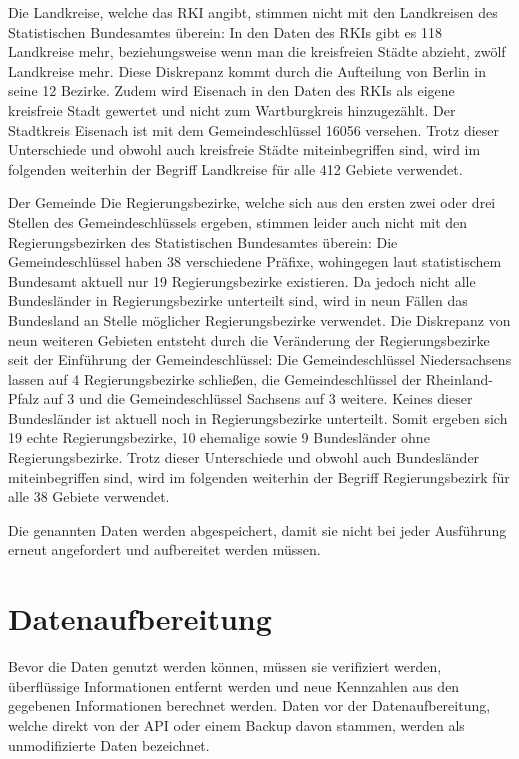Die Landkreise, welche das RKI angibt, stimmen nicht mit den Landkreisen des Statistischen Bundesamtes  \autocite{statistischesBundesamtLandkreise}
überein: In den Daten des RKIs gibt es 118 Landkreise mehr, beziehungsweise wenn man die kreisfreien Städte abzieht, zwölf Landkreise mehr. Diese Diskrepanz kommt durch die Aufteilung von Berlin in seine 12 Bezirke. Zudem wird Eisenach in den Daten des RKIs als eigene kreisfreie Stadt gewertet und nicht zum Wartburgkreis hinzugezählt. Der Stadtkreis Eisenach ist mit dem Gemeindeschlüssel 16056 versehen. Trotz dieser Unterschiede und obwohl auch kreisfreie Städte miteinbegriffen sind, wird im folgenden weiterhin der Begriff \glqq{}Landkreise\grqq{} für alle 412 Gebiete verwendet.

Der Gemeinde
Die Regierungsbezirke, welche sich aus den ersten zwei oder drei Stellen des Gemeindeschlüssels ergeben, stimmen leider auch nicht mit den Regierungsbezirken des Statistischen Bundesamtes
\autocite{statistischesBundesamtRegierungsbezirke}
überein: Die Gemeindeschlüssel haben 38 verschiedene Präfixe, wohingegen laut statistischem Bundesamt aktuell nur 19 Regierungsbezirke existieren.
Da jedoch nicht alle Bundesländer in Regierungsbezirke unterteilt sind, wird in neun Fällen das Bundesland an Stelle möglicher Regierungsbezirke verwendet. Die Diskrepanz von neun weiteren Gebieten entsteht durch die Veränderung der Regierungsbezirke seit der Einführung der Gemeindeschlüssel: Die Gemeindeschlüssel Niedersachsens lassen auf 4 Regierungsbezirke schließen, die Gemeindeschlüssel der Rheinland-Pfalz auf 3 und die Gemeindeschlüssel Sachsens auf 3 weitere. Keines dieser Bundesländer ist aktuell noch in Regierungsbezirke unterteilt. Somit ergeben sich 19 echte Regierungsbezirke, 10 ehemalige sowie 9 Bundesländer ohne Regierungsbezirke.
Trotz dieser Unterschiede und obwohl auch Bundesländer miteinbegriffen sind, wird im folgenden weiterhin der Begriff \glqq{}Regierungsbezirk\grqq{} für alle 38 Gebiete verwendet.

Die genannten Daten werden abgespeichert, damit sie nicht bei jeder Ausführung erneut angefordert und aufbereitet werden müssen.
\section{Datenaufbereitung}
Bevor die Daten genutzt werden können, müssen sie verifiziert werden, überflüssige Informationen entfernt werden und neue Kennzahlen aus den gegebenen Informationen berechnet werden. Daten vor der Datenaufbereitung, welche direkt von der API oder einem Backup davon stammen, werden als \glqq{}unmodifizierte\grqq{} Daten bezeichnet. 

